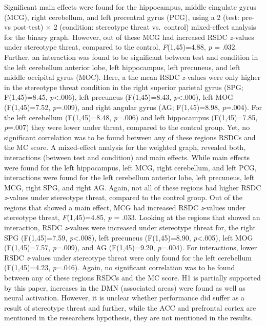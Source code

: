 \documentclass[
  stu]{apa7}
\begin{document}
Significant main effects were found for the hippocampus, middle cingulate gyrus (MCG), right cerebellum, and left precentral gyrus (PCG), using a 2 (test: pre- vs post-test) \(\times\) 2 (condition: stereotype threat vs.~control) mixed-effect analysis for the binary graph.
However, out of these MCG had increased RSDC \emph{z}-values under stereotype threat, compared to the control, \emph{F}(1,45)=4.88, \emph{p} = .032.
Further, an interaction was found to be significant between test and condition in the left cerebellum anterior lobe, left hippocampus, left precuneus, and left middle occipital gyrus (MOC).
Here, a the mean RSDC \emph{z}-values were only higher in the stereotype threat condition in the right superior parietal gyrus (SPG; F(1,45)=8.45, \emph{p}\textless.006), left precuneus (F(1,45)=8.43, \emph{p}\textless.006), left MOG (F(1,45)=7.52, \emph{p}=.009), and right angular gyrus (AG; F(1,45)=8.98, \emph{p}=.004).
For the left cerebellum (F(1,45)=8.48, \emph{p}=.006) and left hippocampus (F(1,45)=7.85, \emph{p}=.007) they were lower under threat, compared to the control group.
Yet, no significant correlation was to be found between any of these regions RSDCs and the MC score.
A mixed-effect analysis for the weighted graph, revealed both, interactions (between test and condition) and main effects.
While main effects were found for the left hippocampus, left MCG, right cerebellum, and left PCG, interactions were found for the left cerebellum anterior lobe, left precuneus, left MCG, right SPG, and right AG.
Again, not all of these regions had higher RSDC \emph{z}-values under stereotype threat, compared to the control group.
Out of the regions that showed a main effect, MCG had increased RSDC \emph{z}-values under stereotype threat, \emph{F}(1,45)=4.85, \emph{p} = .033.
Looking at the regions that showed an interaction, RSDC \emph{z}-values were increased under stereotype threat for, the right SPG (F(1,45)=7.59, \emph{p}\textless.008), left precuneus (F(1,45)=8.90, \emph{p}\textless.005), left MOG (F(1,45)=7.57, \emph{p}=.009), and AG (F(1,45)=9.20, \emph{p}=.004).
For interactions, lower RSDC \emph{z}-values under stereotype threat were only found for the left cerebellum (F(1,45)=4.23, \emph{p}=.046).
Again, no significant correlation was to be found between any of these regions RSDCs and the MC score.
H1 is partially supported by this paper, increases in the DMN (associated areas) were found as well as neural activation. However, it is unclear whether performance did suffer as a result of stereotype threat and further, while the ACC and prefrontal cortex are mentioned in the researchers hypothesis, they are not mentioned in the results.
\end{document}
